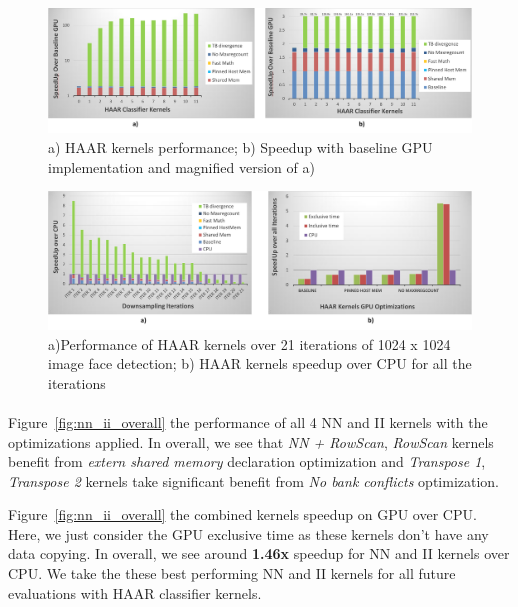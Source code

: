 \begin{figure}[h]
  \centering
  \includegraphics[width=\linewidth]{figs/haar_kernels_crop.pdf}
  \caption{a) HAAR kernels performance; b) Speedup with baseline GPU implementation and magnified version of a)}
  \label{fig:haar_kernels}
\end{figure}


\begin{figure}[h]
  \centering
  \includegraphics[width=\linewidth]{figs/haar_overall_crop.pdf}
  \caption{a)Performance of HAAR kernels over 21 iterations of 1024 x 1024 image face detection; b) HAAR kernels speedup over CPU for all the iterations}
  \label{fig:haar_overall}
\end{figure}


\paragraph{}
Figure~\ref{fig:nn_ii_overall} \color{red}{a)} \color{black}{shows} the performance of all 4 NN and II kernels with the optimizations
applied. In overall, we see that \emph{NN + RowScan}, \emph{RowScan} kernels benefit from \emph{extern shared memory} declaration optimization 
and \emph{Transpose 1}, \emph{Transpose 2} kernels take significant benefit from \emph{No bank conflicts} optimization.

Figure~\ref{fig:nn_ii_overall} \color{red}{b)} \color{black}{shows} the combined kernels speedup on GPU over CPU. Here, we just consider the GPU exclusive time as these
kernels don't have any data copying. In overall, we see around \textbf{1.46x} speedup for NN and II kernels over CPU. 
We take the these best performing NN and II kernels for all future evaluations with HAAR classifier kernels.


